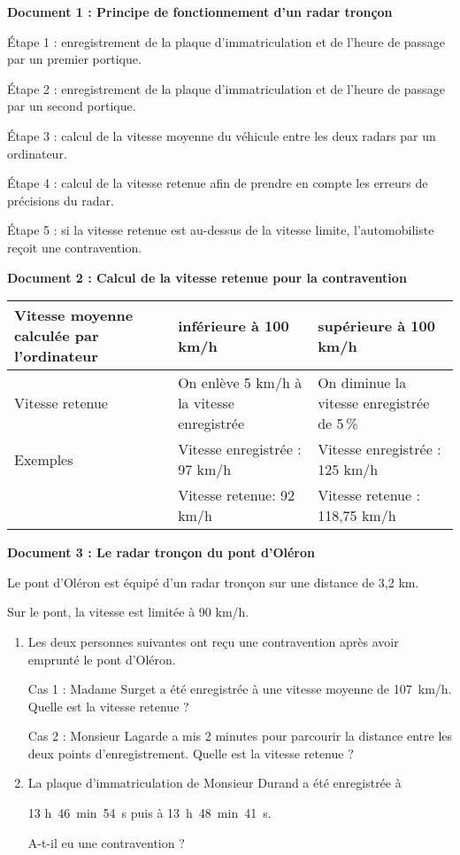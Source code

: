 
\medskip

\textbf{Document 1 : Principe de fonctionnement d'un radar tronçon}

\medskip

 Étape 1 : enregistrement de la plaque d'immatriculation et de l'heure de passage par un premier portique. 
 
Étape 2 : enregistrement de la plaque d'immatriculation et de l'heure de passage par un second portique. 

Étape 3 : calcul de la vitesse moyenne du véhicule entre les deux radars par un ordinateur. 

Étape 4 : calcul de la vitesse retenue afin de prendre en compte les erreurs de précisions du radar. 

Étape 5 : si la vitesse retenue est au-dessus de la vitesse limite, l'automobiliste reçoit une contravention. 

\medskip

\textbf{Document 2 : Calcul de la vitesse retenue pour la contravention}

\medskip
\begin{footnotesize}
\begin{tabularx}{\linewidth}{|*{3}{>{\centering \arraybackslash}X|}}\hline     
Vitesse moyenne calculée par  l'ordinateur&  inférieure à 100 km/h&   supérieure à 100 km/h \\ \hline  
Vitesse retenue&On enlève 5 km/h à la vitesse enregistrée&On diminue la vitesse  enregistrée de 5\,\%\\ \hline   
Exemples&Vitesse enregistrée : 97 km/h  & Vitesse enregistrée : 125 km/h   \\
&Vitesse retenue: 92 km/h&Vitesse retenue : 118,75 km/h \\ \hline
\end{tabularx}
\end{footnotesize}

\medskip

\textbf{Document 3 : Le radar tronçon du pont d'Oléron}

\medskip 

Le pont d'Oléron est équipé d'un radar tronçon sur une distance de 3,2 km. 

Sur le pont, la vitesse est limitée à 90 km/h. 

\medskip

\begin{enumerate}
\item Les deux personnes suivantes ont reçu une contravention après avoir emprunté le pont d'Oléron. 

Cas 1 : Madame Surget a été enregistrée à une vitesse moyenne de 107~km/h. Quelle est la vitesse retenue ? 

Cas 2 : Monsieur Lagarde a mis 2 minutes pour parcourir la distance entre les deux points d'enregistrement. Quelle est la vitesse retenue ? 

\item La plaque d'immatriculation de Monsieur Durand a été enregistrée à 

13 h~46~min~54~s puis à 13~h~48~min~41~s. 

A-t-il eu une contravention ? 
\end{enumerate}

\vspace{0.5cm}

